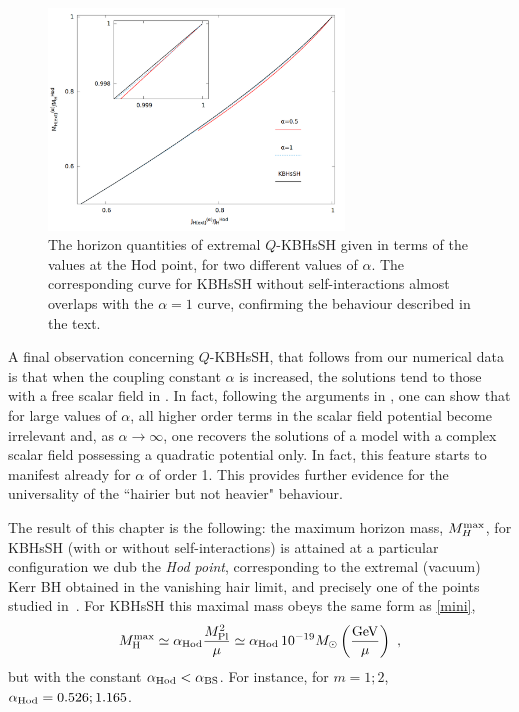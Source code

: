 \begin{figure}[h!]
  \begin{center}
    \includegraphics[width=0.7\textwidth]{papers/selfInteractions/horizon-ratios-Q.png}
      \end{center}
      \caption{ The horizon quantities of extremal  $Q$-KBHsSH given in terms of the values at the Hod point, for two different values of $\alpha$. The corresponding curve for KBHsSH without self-interactions almost overlaps with the $\alpha=1$ curve, confirming the behaviour described in the text.}
  \label{horizon_ratios_q}
\end{figure}


A final observation concerning $Q$-KBHsSH, that follows from our numerical data 
is that 
when the coupling 
constant  $\alpha$ is increased,
the solutions tend to those with a free scalar field in \cite{Herdeiro:2014goa}. 
In fact, 
following the arguments in \cite{Kleihaus:2005me}, one can show that 
for large values of $\alpha$, all higher order terms in the scalar field potential become irrelevant
and, as $\alpha\to \infty$, one recovers the solutions of a model with a complex scalar field  
possessing a quadratic potential only. In fact, this feature starts to manifest already for $\alpha$  of order 1. This provides further evidence for the universality of the ``hairier but not heavier" behaviour.

\bigskip

The result of this chapter is the following: the maximum horizon mass, $M^{\rm max}_H$, for KBHsSH (with or without self-interactions) is attained at a particular configuration we dub the \textit{Hod point}, corresponding to the extremal (vacuum) Kerr BH obtained in the vanishing hair limit, and precisely one of the points studied in~\cite{Hod:2012px}.
For KBHsSH this maximal mass obeys the same form as \eqref{mini},
\begin{equation}
  M_{\rm H}^{\rm max}\simeq \alpha_{\rm Hod} \frac{M_{\rm Pl}^2}{\mu}\simeq \alpha_{\rm Hod} \, 10^{-19}M_\odot\left(\frac{\rm GeV}{\mu}\right)\ , 
\label{hodpoint}
\end{equation}
 but with the constant $\alpha_{\rm Hod}<\alpha_{\rm BS}$. For instance, for $m=1;2$, $\alpha_{\rm Hod}=0.526; 1.165$. 

